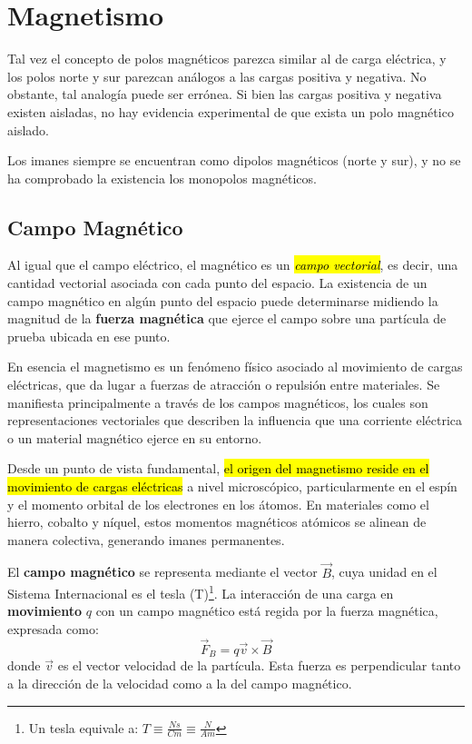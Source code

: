 \section{Magnetismo}

Tal vez el concepto de polos magnéticos parezca similar al de carga eléctrica, y los polos norte y sur parezcan análogos a las cargas positiva y negativa. No obstante, tal analogía puede ser errónea. Si bien las cargas positiva y negativa existen aisladas, no hay evidencia experimental de que exista un polo magnético aislado.

Los imanes siempre se encuentran como dipolos magnéticos (norte y sur), y no se ha comprobado la existencia los monopolos magnéticos.

\subsection{Campo Magnético}

Al igual que el campo eléctrico, el magnético es un \hl{\textit{campo vectorial}}, es decir, una cantidad vectorial asociada con cada punto del espacio. La existencia de un campo magnético en algún punto del espacio puede determinarse midiendo la magnitud de la \textbf{fuerza magnética} que ejerce el campo sobre una partícula de prueba ubicada en ese punto.

En esencia el magnetismo es un fenómeno físico asociado al movimiento de cargas eléctricas, que da lugar a fuerzas de atracción o repulsión entre materiales. Se manifiesta principalmente a través de los campos magnéticos, los cuales son representaciones vectoriales que describen la influencia que una corriente eléctrica o un material magnético ejerce en su entorno.

Desde un punto de vista fundamental, \hl{el origen del magnetismo reside en el movimiento de cargas eléctricas} a nivel microscópico, particularmente en el espín y el momento orbital de los electrones en los átomos. En materiales como el hierro, cobalto y níquel, estos momentos magnéticos atómicos se alinean de manera colectiva, generando imanes permanentes.

El \textbf{campo magnético} se representa mediante el vector \(\vec{B}\), cuya unidad en el Sistema Internacional es el tesla (T)\footnote{Un tesla equivale a: \(T \equiv \frac{Ns}{Cm} \equiv \frac{N}{Am}\)}. La interacción de una carga en \textbf{movimiento} \(q\) con un campo magnético está regida por la fuerza magnética, expresada como:
\begin{equation}
  \vec{F}_B = q\vec{v} \times \vec{B}
  \label{eq:fuerza_magnética}
\end{equation}
donde \(\vec{v}\) es el vector velocidad de la partícula. Esta fuerza es perpendicular tanto a la dirección de la velocidad como a la del campo magnético.


